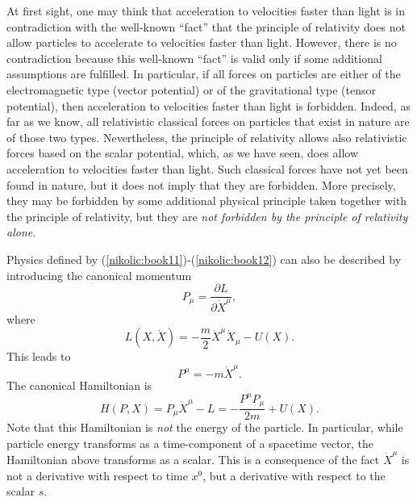 \documentclass[12pt,twoside]{report} %
\begin{document}
At first sight, one may think that acceleration to velocities faster than light
is in contradiction with the well-known ``fact'' that the principle of relativity
does not allow particles to accelerate to velocities faster than light. 
However, there is no contradiction because this well-known ``fact'' is valid
only if some additional assumptions are fulfilled. In particular, if all forces
on particles are either of the electromagnetic type (vector potential) 
or of the gravitational type (tensor potential), then acceleration to velocities
faster than light is forbidden. Indeed, as far as we know, 
all relativistic classical forces on particles that exist in nature are of those two types.
Nevertheless, the principle of relativity allows also relativistic forces based
on the scalar potential, which, as we have seen, does allow acceleration to velocities
faster than light. Such classical forces have not yet been found in nature,
but it does not imply that they are forbidden. More precisely,
they may be forbidden by some additional physical principle taken together with the principle of relativity, but they 
are {\em not forbidden by the principle of relativity alone}.
 
Physics defined by (\ref{nikolic:book11})-(\ref{nikolic:book12}) can also be described by introducing
the canonical momentum
\begin{equation}\label{nikolic:book14}
 P_{\mu}=\frac{\partial L}{\partial \dot{X}^{\mu}} ,
\end{equation}
where  
\begin{equation}\label{nikolic:book15}
 L(X,\dot{X})=- \frac{m}{2} \dot{X}^{\mu} \dot{X}_{\mu} - U(X)   .
\end{equation}
This leads to
\begin{equation}\label{nikolic:book16}
 P^{\mu}=-m\dot{X}^{\mu} .
\end{equation}
The canonical Hamiltonian is
\begin{equation}\label{nikolic:book17}
H(P,X)=P_{\mu}\dot{X}^{\mu}-L=-\frac{P^{\mu}P_{\mu}}{2m}+U(X) .
\end{equation}
Note that this Hamiltonian is {\em not} the energy of the particle. In particular,
while particle energy transforms as a time-component of a spacetime vector,
the Hamiltonian above transforms as a scalar. This is a consequence of the fact 
$\dot{X}^{\mu}$ is not a derivative with respect to time $x^0$, but a derivative
with respect to the scalar $s$.
\end{document}
